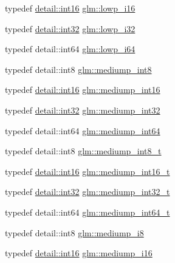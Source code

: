 \begin{DoxyCompactItemize}
typedef \hyperlink{stb__image_8c_a259fa4834387bd68627ddf37bb3ebdb9}{detail\+::int16} \hyperlink{group__gtc__type__precision_gaf7bbfd31bcec25a416ea94d09efb5451}{glm\+::lowp\+\_\+i16}
\item 
typedef \hyperlink{stb__image_8c_a43d43196463bde49cb067f5c20ab8481}{detail\+::int32} \hyperlink{group__gtc__type__precision_ga70fd34e8b8cffc92739161284ed77328}{glm\+::lowp\+\_\+i32}
\item 
typedef detail\+::int64 \hyperlink{group__gtc__type__precision_ga1f4ded25f71c0f3b4518936d50b54b6e}{glm\+::lowp\+\_\+i64}
\item 
typedef detail\+::int8 \hyperlink{group__gtc__type__precision_ga3ee8faab2278c44c5785af04b7b18a14}{glm\+::mediump\+\_\+int8}
\item 
typedef \hyperlink{stb__image_8c_a259fa4834387bd68627ddf37bb3ebdb9}{detail\+::int16} \hyperlink{group__gtc__type__precision_ga4611997edb6c61606daa11990cf08798}{glm\+::mediump\+\_\+int16}
\item 
typedef \hyperlink{stb__image_8c_a43d43196463bde49cb067f5c20ab8481}{detail\+::int32} \hyperlink{group__gtc__type__precision_ga0660a752402702f420f13c686a7fff29}{glm\+::mediump\+\_\+int32}
\item 
typedef detail\+::int64 \hyperlink{group__gtc__type__precision_ga603c695fe5cd677d3f72a81343e19a74}{glm\+::mediump\+\_\+int64}
\item 
typedef detail\+::int8 \hyperlink{group__gtc__type__precision_ga626ac5f73d3538e62a879d6c56abfb36}{glm\+::mediump\+\_\+int8\+\_\+t}
\item 
typedef \hyperlink{stb__image_8c_a259fa4834387bd68627ddf37bb3ebdb9}{detail\+::int16} \hyperlink{group__gtc__type__precision_ga478fab608cf43040013d719a3e03b194}{glm\+::mediump\+\_\+int16\+\_\+t}
\item 
typedef \hyperlink{stb__image_8c_a43d43196463bde49cb067f5c20ab8481}{detail\+::int32} \hyperlink{group__gtc__type__precision_gafd9b4bd9e4465aec63351b59100692c4}{glm\+::mediump\+\_\+int32\+\_\+t}
\item 
typedef detail\+::int64 \hyperlink{group__gtc__type__precision_ga555a2f85641550c232db473a9bb981f7}{glm\+::mediump\+\_\+int64\+\_\+t}
\item 
typedef detail\+::int8 \hyperlink{group__gtc__type__precision_ga28a8b5fd51072680bb55178c17cc7411}{glm\+::mediump\+\_\+i8}
\item 
typedef \hyperlink{stb__image_8c_a259fa4834387bd68627ddf37bb3ebdb9}{detail\+::int16} \hyperlink{group__gtc__type__precision_ga8454fc6a82c7bb787d0ac9663e08f63d}{glm\+::mediump\+\_\+i16}

\end{DoxyCompactItemize}

